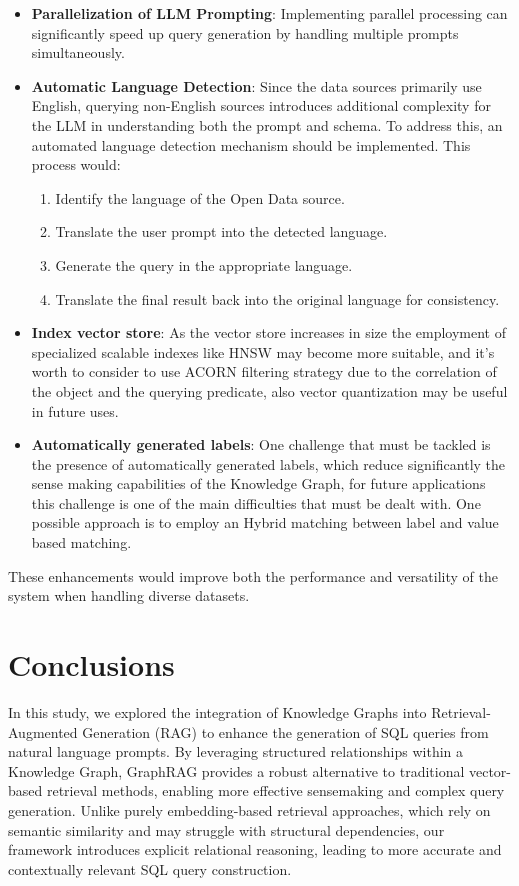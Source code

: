 \begin{itemize}
    \item \textbf{Parallelization of LLM Prompting}: Implementing parallel processing can significantly speed up query generation by handling multiple prompts simultaneously.  
    \item \textbf{Automatic Language Detection}: Since the data sources primarily use English, querying non-English sources introduces additional complexity for the LLM in understanding both the prompt and schema. To address this, an automated language detection mechanism should be implemented. This process would:
    \begin{enumerate}
        \item Identify the language of the Open Data source.
        \item Translate the user prompt into the detected language.
        \item Generate the query in the appropriate language.
        \item Translate the final result back into the original language for consistency.
    \end{enumerate}
    \item  \textbf{Index vector store}: As the vector store increases in size the employment of specialized scalable indexes like HNSW may become more suitable, and it's worth to consider to use ACORN filtering strategy due to the correlation of the object and the querying predicate, also vector quantization may be useful in future uses.
    \item  \textbf{Automatically generated labels}: One challenge that must be tackled is the presence of automatically generated labels, which reduce significantly the sense making capabilities of the Knowledge Graph, for future applications this challenge is one of the main difficulties that must be dealt with. One possible approach is to employ an Hybrid matching between label and value based matching.
\end{itemize}

These enhancements would improve both the performance and versatility of the system when handling diverse datasets.

\section{Conclusions}  

In this study, we explored the integration of Knowledge Graphs into Retrieval-Augmented Generation (RAG) to enhance the generation of SQL queries from natural language prompts. By leveraging structured relationships within a Knowledge Graph, GraphRAG provides a robust alternative to traditional vector-based retrieval methods, enabling more effective sensemaking and complex query generation. Unlike purely embedding-based retrieval approaches, which rely on semantic similarity and may struggle with structural dependencies, our framework introduces explicit relational reasoning, leading to more accurate and contextually relevant SQL query construction.  

